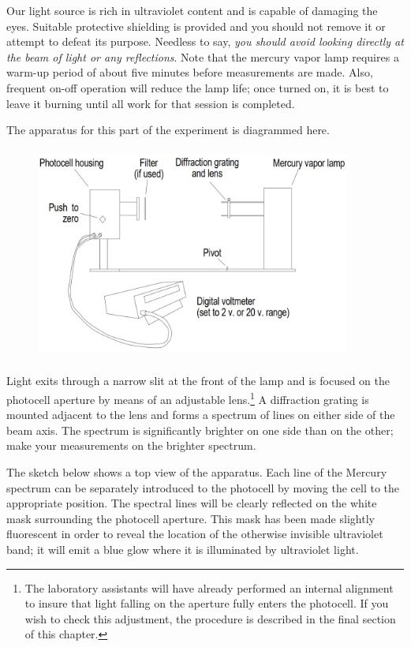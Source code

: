Our light source is rich in ultraviolet content and is capable of
damaging the eyes. Suitable protective shielding is provided and you
should not remove it or attempt to defeat its purpose. Needless to say,
\emph{you should avoid looking directly at the beam of light or any
reflections}. Note that the mercury vapor lamp requires a warm-up period
of about five minutes before measurements are made. Also, frequent
on-off operation will reduce the lamp life; once turned on, it is best
to leave it burning until all work for that session is completed.

The apparatus for this part of the experiment is diagrammed here.
\begin{figure}[h]
  \begin{center}
  \includegraphics[width=4.08333in,height=2.77083in]{images/06_einstein/003.png}
  \end{center}
\end{figure}


Light exits through a narrow slit at the front of the lamp and is focused on
the photocell aperture by means of an adjustable lens.\footnote{The
  laboratory assistants will have already performed an internal
  alignment to insure that light falling on the aperture fully enters
  the photocell. If you wish to check this adjustment, the procedure is
  described in the final section of this chapter.} A diffraction grating is mounted adjacent to
the lens and forms a spectrum of lines on either side of the beam axis.
The spectrum is significantly brighter on one side than on the other;
make your measurements on the brighter spectrum.

The sketch below shows a top view of the apparatus. Each line of the
Mercury spectrum can be separately introduced to the photocell by moving
the cell to the appropriate position. The spectral lines will be clearly
reflected on the white mask surrounding the photocell aperture. This
mask has been made slightly fluorescent in order to reveal the location
of the otherwise invisible ultraviolet band; it will emit a blue glow
where it is illuminated by ultraviolet light.

